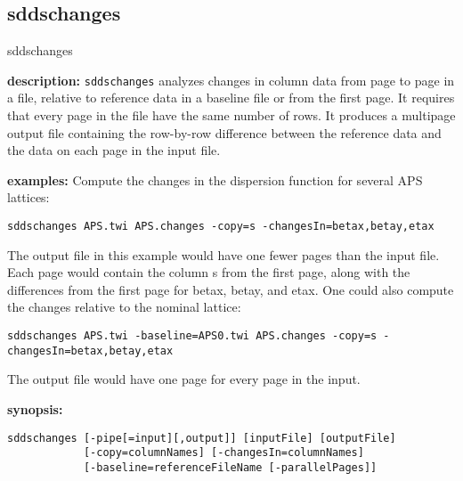 \newpage
\subsection{sddschanges}
\label{sddschanges}

\begin{sddsprog}{sddschanges}
  \item \textbf{description:}
    \verb|sddschanges| analyzes changes in column data from page to page in a file, relative to reference data in a baseline file or from the first page. It requires that every page in the file have the same number of rows. It produces a multipage output file containing the row-by-row difference between the reference data and the data on each page in the input file.

  \item \textbf{examples:}
  Compute the changes in the dispersion function for several APS lattices:
  \begin{verbatim}
sddschanges APS.twi APS.changes -copy=s -changesIn=betax,betay,etax
  \end{verbatim}
  The output file in this example would have one fewer pages than the input file. Each page would contain the column s from the first page, along with the differences from the first page for betax, betay, and etax. One could also compute the changes relative to the nominal lattice:
  \begin{verbatim}
sddschanges APS.twi -baseline=APS0.twi APS.changes -copy=s -changesIn=betax,betay,etax
  \end{verbatim}
  The output file would have one page for every page in the input.

  \item \textbf{synopsis:}
  \begin{verbatim}
sddschanges [-pipe[=input][,output]] [inputFile] [outputFile]
            [-copy=columnNames] [-changesIn=columnNames]
            [-baseline=referenceFileName [-parallelPages]]
  \end{verbatim}


\end{sddsprog}
